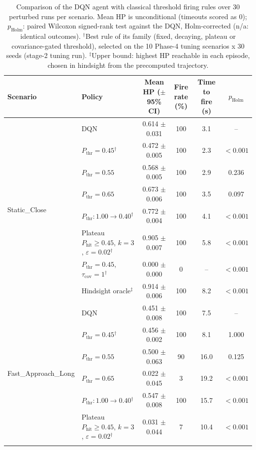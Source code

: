 \begin{table}[htbp]
\centering
\caption{Comparison of the DQN agent with classical threshold firing rules over 30 perturbed runs per scenario. Mean HP is unconditional (timeouts scored as 0); $p_{\mathrm{Holm}}$: paired Wilcoxon signed-rank test against the DQN, Holm-corrected (n/a: identical outcomes). $^{\dagger}$Best rule of its family (fixed, decaying, plateau or covariance-gated threshold), selected on the 10 Phase-4 tuning scenarios x 30 seeds (stage-2 tuning run). $^{\ddagger}$Upper bound: highest HP reachable in each episode, chosen in hindsight from the precomputed trajectory.}
\label{tab:comparison-traditional-rl}
\small
\begin{tabular}{llcccc}
\toprule
\textbf{Scenario} & \textbf{Policy} & \textbf{Mean HP ($\pm$95\% CI)} & \textbf{Fire rate (\%)} & \textbf{Time to fire (s)} & $p_{\mathrm{Holm}}$ \\
\midrule
\multirow{8}{*}{Static\_Close} & DQN & 0.614 $\pm$ 0.031 & 100 & 3.1 & -- \\
 & $P_{\mathrm{thr}}=0.45$$^{\dagger}$ & 0.472 $\pm$ 0.005 & 100 & 2.3 & $<0.001$ \\
 & $P_{\mathrm{thr}}=0.55$ & 0.568 $\pm$ 0.005 & 100 & 2.9 & 0.236 \\
 & $P_{\mathrm{thr}}=0.65$ & 0.673 $\pm$ 0.006 & 100 & 3.5 & 0.097 \\
 & $P_{\mathrm{thr}}: 1.00 \to 0.40$$^{\dagger}$ & 0.772 $\pm$ 0.004 & 100 & 4.1 & $<0.001$ \\
 & Plateau $P_{\mathrm{hit}}\geq0.45$, $k=3$, $\varepsilon=0.02$$^{\dagger}$ & 0.905 $\pm$ 0.007 & 100 & 5.8 & $<0.001$ \\
 & $P_{\mathrm{thr}}=0.45$, $\tau_{\mathrm{cov}}=1$$^{\dagger}$ & 0.000 $\pm$ 0.000 & 0 & -- & $<0.001$ \\
 & Hindsight oracle$^{\ddagger}$ & 0.914 $\pm$ 0.006 & 100 & 8.2 & $<0.001$ \\
\midrule
\multirow{8}{*}{Fast\_Approach\_Long} & DQN & 0.451 $\pm$ 0.008 & 100 & 7.5 & -- \\
 & $P_{\mathrm{thr}}=0.45$$^{\dagger}$ & 0.456 $\pm$ 0.002 & 100 & 8.1 & 1.000 \\
 & $P_{\mathrm{thr}}=0.55$ & 0.500 $\pm$ 0.063 & 90 & 16.0 & 0.125 \\
 & $P_{\mathrm{thr}}=0.65$ & 0.022 $\pm$ 0.045 & 3 & 19.2 & $<0.001$ \\
 & $P_{\mathrm{thr}}: 1.00 \to 0.40$$^{\dagger}$ & 0.547 $\pm$ 0.008 & 100 & 15.7 & $<0.001$ \\
 & Plateau $P_{\mathrm{hit}}\geq0.45$, $k=3$, $\varepsilon=0.02$$^{\dagger}$ & 0.031 $\pm$ 0.044 & 7 & 10.4 & $<0.001$ \\
$$
\end{tabular}
\end{table}
